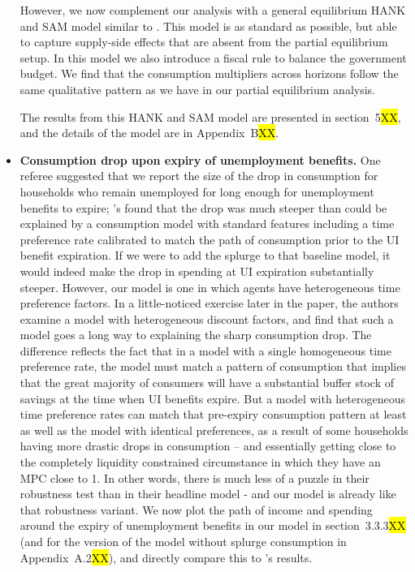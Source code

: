 \begin{itemize}
	However, we now complement our analysis with a general equilibrium HANK and SAM model similar to \citet{Ravn2017}. This model is as standard as possible, but able to capture supply-side effects that are absent from the partial equilibrium setup. In this model we also introduce a fiscal rule to balance the government budget. We find that the consumption multipliers across horizons follow the same qualitative pattern as we have in our partial equilibrium analysis.
	
	The results from this HANK and SAM model are presented in section~5\hl{XX}, and the details of the model are in Appendix~B\hl{XX}.
	
      \item \textbf{Consumption drop upon expiry of unemployment benefits.} One referee suggested that we report the size of the drop in consumption for households who remain unemployed for long enough for unemployment benefits to expire; \citeauthor{ganongconsumer2019}'s found that the drop was much steeper than could be explained by a consumption model with standard features including a time preference rate calibrated to match the path of consumption prior to the UI benefit expiration.  If we were to add the splurge to that baseline model, it would indeed make the drop in spending at UI expiration substantially steeper. However, our model is one in which agents have heterogeneous time preference factors.  In a little-noticed exercise later in the \citeauthor{gangongconsumer2019} paper, the authors examine a model with heterogeneous discount factors, and find that such a model goes a long way to explaining the sharp consumption drop.  The difference reflects the fact that in a model with a single homogeneous time preference rate, the model must match a pattern of consumption that implies that the great majority of consumers will have a substantial buffer stock of savings at the time when UI benefits expire.  But a model with heterogeneous time preference rates can match that pre-expiry consumption pattern at least as well as the model with identical preferences, as a result of some households having more drastic drops in consumption -- and essentially getting close to the completely liquidity constrained circumstance in which they have an MPC close to 1.  In other words, there is much less of a puzzle in their robustness test than in their headline model - and our model is already like that robustness variant.
        We now plot the path of income and spending around the expiry of unemployment benefits in our model in section~3.3.3\hl{XX} (and for the version of the model without splurge consumption in Appendix~A.2\hl{XX}), and directly compare this to \citeauthor{ganongconsumer2019}'s results.
	
	
\end{itemize}
